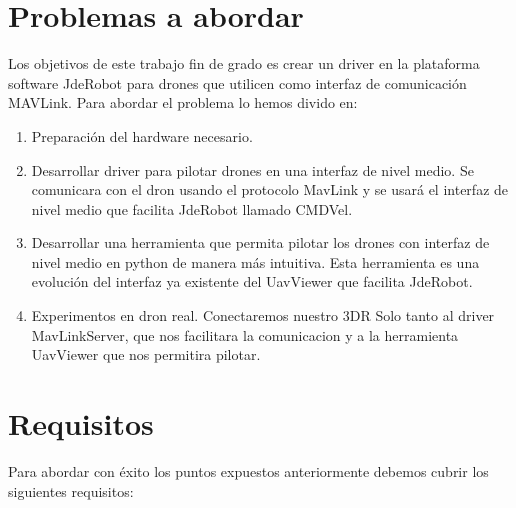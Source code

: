 \section{Problemas a abordar}

Los objetivos de este trabajo fin de grado es crear un driver en la plataforma software
JdeRobot para drones que utilicen como interfaz de comunicación MAVLink. Para
abordar el problema lo hemos divido en:

\begin{enumerate}
\item Preparación del hardware necesario.
\item Desarrollar driver para pilotar drones en una interfaz de nivel medio. Se comunicara con el dron usando el protocolo MavLink y se usará el interfaz de nivel medio que facilita JdeRobot llamado CMDVel.
\item Desarrollar una herramienta que permita pilotar los drones con interfaz de nivel medio en python de manera más intuitiva. Esta herramienta es una evolución del interfaz ya existente del UavViewer que facilita JdeRobot.
\item Experimentos en dron real. Conectaremos nuestro 3DR Solo tanto al driver MavLinkServer, que nos facilitara la comunicacion y a la herramienta UavViewer que nos permitira pilotar.
\end{enumerate}


\section{Requisitos}

Para abordar con éxito los puntos expuestos anteriormente debemos cubrir los siguientes requisitos:

